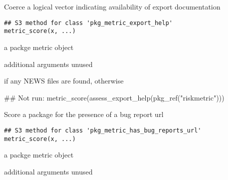 \documentclass[a4paper]{book}
\begin{document}
%
\begin{Description}
Coerce a logical vector indicating availability of export documentation
\end{Description}
%
\begin{Usage}
\begin{verbatim}
## S3 method for class 'pkg_metric_export_help'
metric_score(x, ...)
\end{verbatim}
\end{Usage}
%
\begin{Arguments}
\begin{ldescription}
\item[\code{x}] a  packge metric object

\item[\code{...}] additional arguments unused
\end{ldescription}
\end{Arguments}
%
\begin{Value}
 if any NEWS files are found, otherwise 
\end{Value}
%
\begin{Examples}
\begin{ExampleCode}
## Not run: metric_score(assess_export_help(pkg_ref("riskmetric")))

\end{ExampleCode}
\end{Examples}
%
\begin{Description}
Score a package for the presence of a bug report url
\end{Description}
%
\begin{Usage}
\begin{verbatim}
## S3 method for class 'pkg_metric_has_bug_reports_url'
metric_score(x, ...)
\end{verbatim}
\end{Usage}
%
\begin{Arguments}
\begin{ldescription}
\item[\code{x}] a  packge metric object

\item[\code{...}] additional arguments unused
\end{ldescription}
\end{Arguments}
\end{document}
